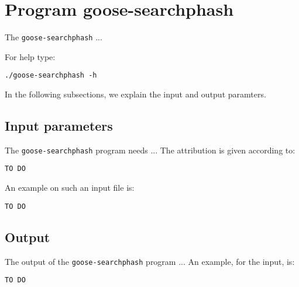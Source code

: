 \section{Program goose-searchphash}
The \texttt{goose-searchphash} ...

For help type:
\begin{lstlisting}
./goose-searchphash -h
\end{lstlisting}
In the following subsections, we explain the input and output paramters.

\subsection{Input parameters}

The \texttt{goose-searchphash} program needs ...
The attribution is given according to:
\begin{lstlisting}
TO DO
\end{lstlisting}

An example on such an input file is:
\begin{lstlisting}
TO DO
\end{lstlisting}

\subsection{Output}
The output of the \texttt{goose-searchphash} program ...
An example, for the input, is:
\begin{lstlisting}
TO DO
\end{lstlisting}
